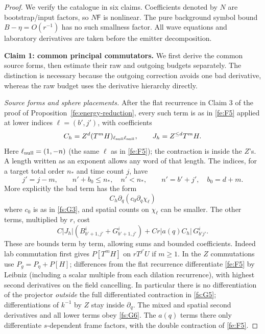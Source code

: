 \begin{proof}
We verify the catalogue in six claims.  Coefficients denoted by $N$
are bootstrap/input factors, so $N\mathsf F$ is nonlinear.  The pure
background symbol bound $B-\eta=O(r^{-1})$ has no such smallness factor.
All wave equations and laboratory derivatives are taken before the
emitter decomposition.

\par\medskip\noindent\textbf{Claim 1: common principal commutators.}\label{fs:claim-principal}\quad
We first derive the common source forms, then estimate their raw and
outgoing budgets separately.  The distinction is necessary because the
outgoing correction avoids one bad derivative, whereas the raw budget
uses the derivative hierarchy directly.

\smallskip\noindent\emph{Source forms and sphere placements.}
After the flat recurrence in Claim 3 of the proof of
Proposition~\ref{fe:energy-reduction}, every such term is as in \eqref{fe:F5} applied at lower indices \(\ell=(b',j')\), with coefficients
\[
  C_h=Z^d (T^m H)_{\ell_{\rm null}\ell_{\rm null}},
                 \qquad J_h=Z^{\le d} T^m H .
\]
Here \(\ell_{\rm null}=(1,-n)\) (the same \(\ell\) as in \eqref{fe:F5}); the contraction is inside the \(Z\)'s. A length written as an exponent allows any word of that length. The indices, for a target total order \(n_*\) and time count \(j\), have
\[
 j'=j-m,\qquad n'+b_0\le n_*,\quad n'<n_*,
        \qquad n'=b'+j',\quad b_0=d+m.
\]
More explicitly the bad term has the form
\begin{equation}
\label{fs:G5}
C_h\partial_q(c_0\partial_q\chi_\ell)
\end{equation}
where \(c_0\) is as in \eqref{fs:G3}, and spatial counts on \(\chi_\ell\) can be smaller. The other terms, multiplied by \(r\), cost
\begin{equation}
\label{fs:G6}
C |J_h|(B^i_{b'+1,j'}+G^i_{b'+1,j'})
                + C r |a(q) C_h|\, G^i_{b' j'}.
\end{equation}
These are bounds term by term, allowing sums and bounded coefficients. Indeed lab commutation first gives \(P[T^m H]\) on \(rT^{j'}U\) if \(m\ge1\). In the \(Z\) commutations use \(P_g=P_\eta+P[H]\); differences from the flat recurrence differentiate \eqref{fe:F5} by Leibniz (including a scalar multiple from each dilation recurrence), with highest second derivatives on the field cancelling. In particular there is no differentiation of the projector \emph{outside} the full differentiated contraction in \eqref{fs:G5}; differentiations of \(k^{-1}\) by \(Z\) stay inside \(\partial_q\). The mixed and spatial second derivatives and all lower terms obey \eqref{fs:G6}. The \(a(q)\) terms there only differentiate \(s\)-dependent frame factors, with the double contraction of \eqref{fe:F5}.


\end{proof}
